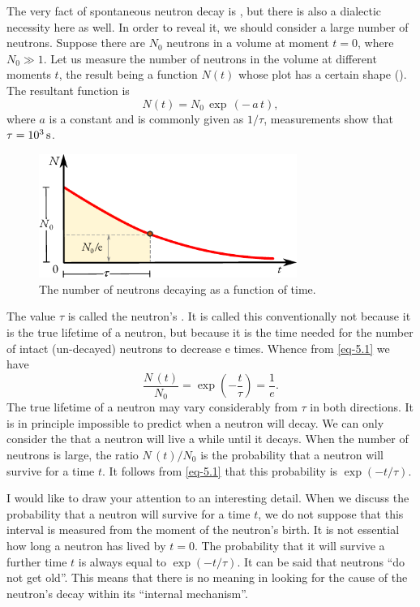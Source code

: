 The very fact of spontaneous neutron decay is , but there is
also a dialectic necessity here as well. In order to reveal it, we should
consider a large number of neutrons. Suppose there are $N_{0}$ neutrons in a volume at moment $t = 0$, where $N_{0} \gg 1$. Let us measure the number of neutrons in the volume at different moments $t$, the result being a function $N (t)$ whose plot has a certain shape (). The resultant
function is
\begin{equation}%
N(t) = N_{0} \, \exp \, ( - \,a \,t),
\label{eq-5.1}
\end{equation}
where $a$ is a constant and is commonly given as $1/\tau$, measurements
show that $\tau = \SI{d3}{\second}$.

\begin{figure}[!ht]
\centering
\includegraphics[width=0.75\textwidth]{figures/decay.pdf}
\caption{The number of neutrons decaying as a function of time.\label{decay-fn}}
\end{figure}

The value $\tau$ is called the neutron's . It is called this
conventionally not because it is the true lifetime of a neutron, but
because it is the time needed for the number of intact (un-decayed)
neutrons to decrease e times. Whence from \eqref{eq-5.1} we have 
\begin{equation*}
\frac{N\,(t)}{N_{0}} = \exp \left( -\frac{t}{\tau} \right) = \frac{1}{e}.
\end{equation*}
The true lifetime of a neutron may vary considerably from
$\tau$ in both directions. It is in principle impossible to predict when
a neutron will decay. We can only consider the  that
a neutron will live a while until it decays. When the number of neutrons
is large, the ratio $N\, (t) / N_{0}$ is the probability that a neutron will survive for a time $t$. It follows from \eqref{eq-5.1} that this probability is $\exp (-t / \tau)$.

I would like to draw your attention to an interesting detail. When we
discuss the probability that a neutron will survive for a time $t$, we do
not suppose that this interval is measured from the moment of the
neutron's birth. It is not essential how long a neutron has lived by $t = 0$.
The probability that it will survive a further time $t$ is always equal to
$\exp  (-t / \tau)$. It can be said that neutrons ``do not get old''. This means that there is no meaning in looking for the cause of the neutron's decay
within its ``internal mechanism''.

